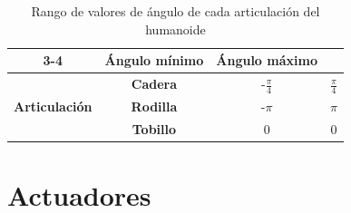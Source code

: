 \documentclass{article}
\begin{document}

\begin {table}[H]
	\begin{center}
		\begin{tabular}{ | c | c || c | c |}
	  		 \cline{3-4}
	  		 \multicolumn{2}{ c |}{}  & \textbf{\'Angulo m\'inimo} & \textbf{\'Angulo m\'aximo}\\
	  		\hline
			\multirow{3}{*}{\textbf{Articulaci\'on}} & \textbf{Cadera} & -$\frac{\pi}{4}$ & $\frac{\pi}{4}$\\
			\cline{2-4}
			& \textbf{Rodilla} & -$\pi$ & $\pi$ \\
			\cline{2-4}
	  		& \textbf{Tobillo} & 0 & 0 \\
	  		\hline		
		\end{tabular}
		\caption{Rango de valores de \'angulo de cada articulaci\'on del humanoide}
		\label{table_articulaciones}
	\end{center}
\end{table}


\section{Actuadores}
\label{actuadores}
\end{document}
